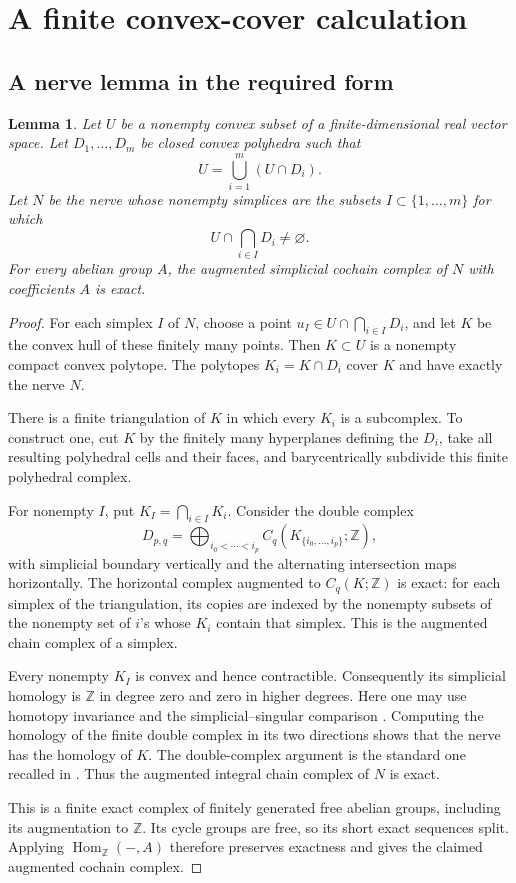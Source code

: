 \documentclass[11pt]{article}
\newtheorem{lemma}[theorem]{Lemma}
\theoremstyle{definition}
\theoremstyle{remark}
\DeclareMathOperator{\Hom}{Hom}
\newcommand{\ZZ}{\mathbb Z}
\begin{document}
\section{A finite convex-cover calculation}

\subsection{A nerve lemma in the required form}

\begin{lemma}\label{lem:convex-nerve}
Let \(U\) be a nonempty convex subset of a finite-dimensional real
vector space. Let \(D_1,\ldots,D_m\) be closed convex polyhedra such
that
\[
U=\bigcup_{i=1}^m(U\cap D_i).
\]
Let \(N\) be the nerve whose nonempty simplices are the subsets
\(I\subset\{1,\ldots,m\}\) for which
\[
U\cap\bigcap_{i\in I}D_i\ne\varnothing.
\]
For every abelian group \(A\), the augmented simplicial cochain
complex of \(N\) with coefficients \(A\) is exact.
\end{lemma}

\begin{proof}
For each simplex \(I\) of \(N\), choose a point
\(u_I\in U\cap\bigcap_{i\in I}D_i\), and let \(K\) be the convex hull
of these finitely many points. Then \(K\subset U\) is a nonempty
compact convex polytope. The polytopes \(K_i=K\cap D_i\) cover \(K\)
and have exactly the nerve \(N\).

There is a finite triangulation of \(K\) in which every \(K_i\) is
a subcomplex. To construct one, cut \(K\) by the finitely many
hyperplanes defining the \(D_i\), take all resulting polyhedral
cells and their faces, and barycentrically subdivide this finite
polyhedral complex.

For nonempty \(I\), put \(K_I=\bigcap_{i\in I}K_i\). Consider the
double complex
\[
D_{p,q}=
\bigoplus_{i_0<\cdots<i_p}
C_q(K_{\{i_0,\ldots,i_p\}};\ZZ),
\]
with simplicial boundary vertically and the alternating
intersection maps horizontally. The horizontal complex augmented
to \(C_q(K;\ZZ)\) is exact: for each simplex of the triangulation,
its copies are indexed by the nonempty subsets of the nonempty
set of \(i\)'s whose \(K_i\) contain that simplex. This is the
augmented chain complex of a simplex.

Every nonempty \(K_I\) is convex and hence contractible.
Consequently its simplicial homology is \(\ZZ\) in degree zero
and zero in higher degrees. Here one may use homotopy invariance
and the simplicial--singular comparison
\cite[Theorems~2.10 and~2.27]{Hatcher}.
Computing the homology of the finite double complex in its two
directions shows that the nerve has the homology of \(K\).
The double-complex argument is the standard one recalled in
\cite[Tag~012X]{Stacks}.
Thus the augmented integral chain complex of \(N\) is exact.

This is a finite exact complex of finitely generated free abelian
groups, including its augmentation to \(\ZZ\). Its cycle groups
are free, so its short exact sequences split. Applying
\(\Hom_{\ZZ}(-,A)\) therefore preserves exactness and gives the
claimed augmented cochain complex.
\end{proof}
\end{document}
